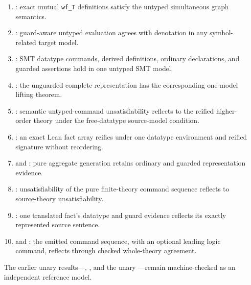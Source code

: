 \documentclass[11pt]{article}
\theoremstyle{remark}
\begin{document}
\begin{sloppypar}
\begin{enumerate}[leftmargin=*]
       the tester/selector predicate emitted by the Crush translator.
 \item {}: exact mutual \texttt{wf\_T}
       definitions satisfy the untyped simultaneous graph semantics.
 \item {}: guard-aware untyped evaluation agrees with
       denotation in any symbol-related target model.
 \item {}: SMT datatype commands, derived definitions, ordinary
       declarations, and guarded assertions hold in one untyped SMT model.
 \item {}: the unguarded complete representation
       has the corresponding one-model lifting theorem.
 \item {}: semantic
       untyped-command unsatisfiability reflects to the reified higher-order theory
       under the free-datatype source-model condition.
 \item {}: an exact Lean fact array reifies under
       one datatype environment and reified signature without reordering.
 \item {} and
       : pure aggregate generation
       retains ordinary and guarded representation evidence.
 \item {}: unsatisfiability
       of the pure finite-theory command sequence reflects to source-theory
       unsatisfiability.
 \item {}: one translated fact's
       datatype and guard evidence reflects its exactly represented source sentence.
 \item {} and
       : the emitted
       command sequence, with an optional leading logic command,
       reflects through checked whole-theory agreement.
\end{enumerate}
\end{sloppypar}

The earlier unary results---,
, and the unary
---remain machine-checked as an
independent reference model.
\end{document}
